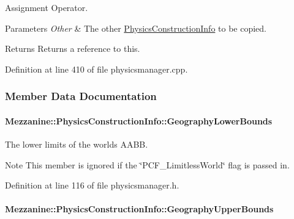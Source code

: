 Assignment Operator. 


\begin{DoxyParams}{Parameters}
{\em Other} & The other \hyperlink{classMezzanine_1_1PhysicsConstructionInfo}{PhysicsConstructionInfo} to be copied. \\
\hline
\end{DoxyParams}
\begin{DoxyReturn}{Returns}
Returns a reference to this. 
\end{DoxyReturn}


Definition at line 410 of file physicsmanager.cpp.



\subsubsection{Member Data Documentation}
\hypertarget{classMezzanine_1_1PhysicsConstructionInfo_aed6f8f0555fe4dec58758f6d774cbcee}{
\paragraph[{GeographyLowerBounds}]{ {\bf Mezzanine::PhysicsConstructionInfo::GeographyLowerBounds}}\hfill}
\label{classMezzanine_1_1PhysicsConstructionInfo_aed6f8f0555fe4dec58758f6d774cbcee}


The lower limits of the worlds AABB. 

\begin{DoxyNote}{Note}
This member is ignored if the \char`\"{}PCF\_\-LimitlessWorld\char`\"{} flag is passed in. 
\end{DoxyNote}


Definition at line 116 of file physicsmanager.h.

\hypertarget{classMezzanine_1_1PhysicsConstructionInfo_aa1794e928aea2ce5f2e9ad4f467b1c14}{
\paragraph[{GeographyUpperBounds}]{ {\bf Mezzanine::PhysicsConstructionInfo::GeographyUpperBounds}}\hfill}
\label{classMezzanine_1_1PhysicsConstructionInfo_aa1794e928aea2ce5f2e9ad4f467b1c14}


